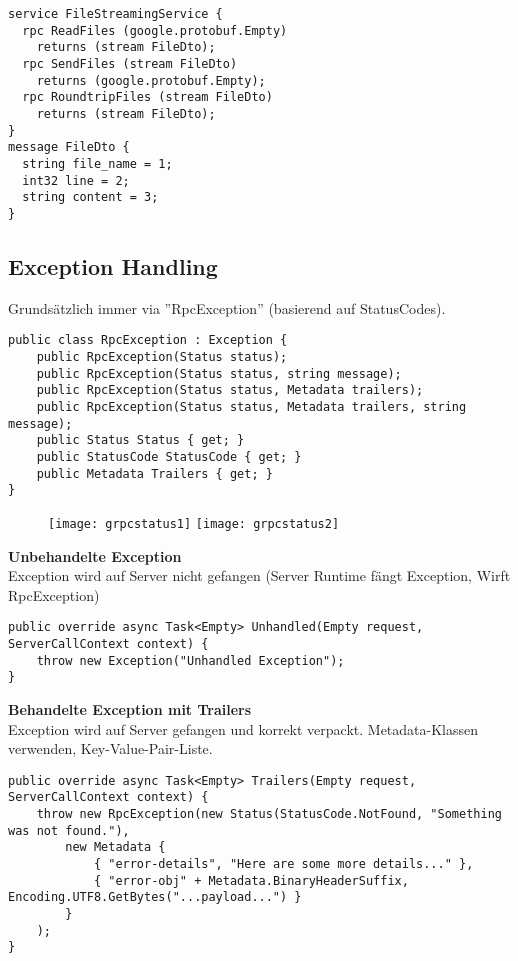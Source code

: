 \begin{lstlisting}
service FileStreamingService {
  rpc ReadFiles (google.protobuf.Empty)
    returns (stream FileDto);
  rpc SendFiles (stream FileDto)
    returns (google.protobuf.Empty);
  rpc RoundtripFiles (stream FileDto) 
    returns (stream FileDto);
}
message FileDto {
  string file_name = 1;
  int32 line = 2;
  string content = 3; 
}
\end{lstlisting}

\subsection{Exception Handling}
Grundsätzlich immer via ”RpcException” (basierend auf StatusCodes).
\begin{lstlisting}
public class RpcException : Exception {
    public RpcException(Status status);
    public RpcException(Status status, string message);
    public RpcException(Status status, Metadata trailers);
    public RpcException(Status status, Metadata trailers, string message);
    public Status Status { get; }
    public StatusCode StatusCode { get; }
    public Metadata Trailers { get; }
}
\end{lstlisting}

\begin{figure}[h!]
  \center
  \texttt{[image: grpcstatus1]}
  \texttt{[image: grpcstatus2]}
\end{figure}

\textbf{Unbehandelte Exception} \\
Exception wird auf Server nicht gefangen (Server Runtime fängt Exception, Wirft RpcException)
\begin{lstlisting}
public override async Task<Empty> Unhandled(Empty request, ServerCallContext context) {
    throw new Exception("Unhandled Exception");
}
\end{lstlisting}

\textbf{Behandelte Exception mit Trailers} \\
Exception wird auf Server gefangen und korrekt verpackt. Metadata-Klassen verwenden, Key-Value-Pair-Liste.
\begin{lstlisting}
public override async Task<Empty> Trailers(Empty request, ServerCallContext context) {
    throw new RpcException(new Status(StatusCode.NotFound, "Something was not found."),
        new Metadata {
            { "error-details", "Here are some more details..." },
            { "error-obj" + Metadata.BinaryHeaderSuffix, Encoding.UTF8.GetBytes("...payload...") }
        }
    );
}
\end{lstlisting}

\pagebreak